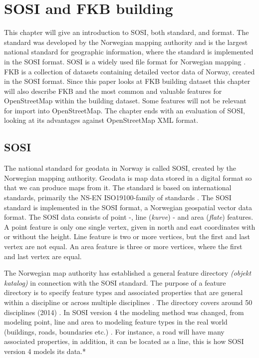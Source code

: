 \chapter{SOSI and FKB building}

This chapter will give an introduction to SOSI, both standard, and format. The standard was developed by the Norwegian mapping authority and is the largest national standard for geographic information, where the standard is implemented in the SOSI format. SOSI is a widely used file format for Norwegian mapping \cite{Kartverketa}. FKB is a collection of datasets containing detailed vector data of Norway, created in the SOSI format. Since this paper looks at FKB building dataset this chapter will also describe FKB and the most common and valuable features for OpenStreetMap within the building dataset. Some features will not be relevant for import into OpenStreetMap. The chapter ends with an evaluation of SOSI, looking at its advantages against OpenStreetMap XML format. 

\section{SOSI}
The national standard for geodata in Norway is called SOSI, created by the Norwegian mapping authority. Geodata is map data stored in a digital format so that we can produce maps from it. The standard is based on international standards, primarily the NS-EN ISO19100-family of standards \cite{Skogseth2014}. The SOSI standard is implemented in the SOSI format, a Norwegian geospatial vector data format. The SOSI data consists of point -, line (\textit{kurve}) - and area (\textit{flate}) features. A point feature is only one single vertex, given in north and east coordinates with or without the height. Line feature is two or more vertices, but the first and last vertex are not equal. An area feature is three or more vertices, where the first and last vertex are equal. 

The Norwegian map authority has established a general feature directory \textit{(objekt katalog)} in connection with the SOSI standard. The purpose of a feature directory is to specify feature types and associated properties that are general within a discipline or across multiple disciplines \cite{Kartverket2016}.  The directory covers around 50 disciplines (2014) \cite{Skogseth2014}.  In SOSI version 4 the modeling method was changed, from modeling point, line and area to modeling feature types in the real world (buildings, roads, boundaries etc.) \cite{Skogseth2014}. For instance, a road will have many associated properties, in addition, it can be located as a line, this is how SOSI version 4 models its data.* %

